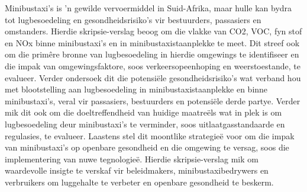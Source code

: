Minibustaxi’s is 'n gewilde vervoermiddel in Suid-Afrika, maar hulle kan bydra tot lugbesoedeling en gesondheidsrisiko’s vir bestuurders, passasiers en omstanders. Hierdie skripsie-verslag beoog om die vlakke van CO2, VOC, fyn stof en NOx binne minibustaxi’s en in minibustaxistaanplekke te meet. Dit streef  ook om die primêre bronne van lugbesoedeling in hierdie omgewings te identifiseer en die impak van omgewingsfaktore, soos verkeersopeenhoping en weerstoestande, te evalueer. Verder ondersoek dit die potensiële gesondheidsrisiko’s wat verband hou met blootstelling aan lugbesoedeling in minibustaxistaanplekke en binne minibustaxi’s, veral vir passasiers, bestuurders en potensiële derde partye. Verder mik dit ook om die doeltreffendheid van huidige maatreëls wat in plek is om lugbesoedeling deur minibustaxi’s te verminder, soos uitlaatgasstandaarde en regulasies, te evalueer. Laastens stel dit moontlike strategieë voor om die impak van minibustaxi’s op openbare gesondheid en die omgewing te versag, soos die implementering van nuwe tegnologieë. Hierdie skripsie-verslag mik om waardevolle insigte te verskaf vir beleidmakers, minibustaxibedrywers en verbruikers om luggehalte te verbeter en openbare gesondheid te beskerm.

